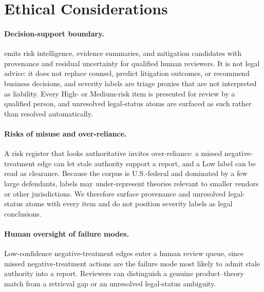 \section*{Ethical Considerations}
\label{sec:ethics}

\paragraph{Decision-support boundary.}
\sysname{} emits risk intelligence, evidence summaries, and mitigation candidates with provenance and residual uncertainty for qualified human reviewers.
It is not legal advice: it does not replace counsel, predict litigation outcomes, or recommend business decisions, and severity labels are triage proxies that are not interpreted as liability.
Every High- or Medium-risk item is presented for review by a qualified person, and unresolved legal-status atoms are surfaced as such rather than resolved automatically.

\paragraph{Risks of misuse and over-reliance.}
A risk register that looks authoritative invites over-reliance: a missed negative-treatment edge can let stale authority support a report, and a Low label can be read as clearance.
Because the corpus is U.S.-federal and dominated by a few large defendants, labels may under-represent theories relevant to smaller vendors or other jurisdictions.
We therefore surface provenance and unresolved legal-status atoms with every item and do not position severity labels as legal conclusions.

\paragraph{Human oversight of failure modes.}
Low-confidence negative-treatment edges enter a human review queue, since missed negative-treatment actions are the failure mode most likely to admit stale authority into a report.
Reviewers can distinguish a genuine product--theory match from a retrieval gap or an unresolved legal-status ambiguity.

